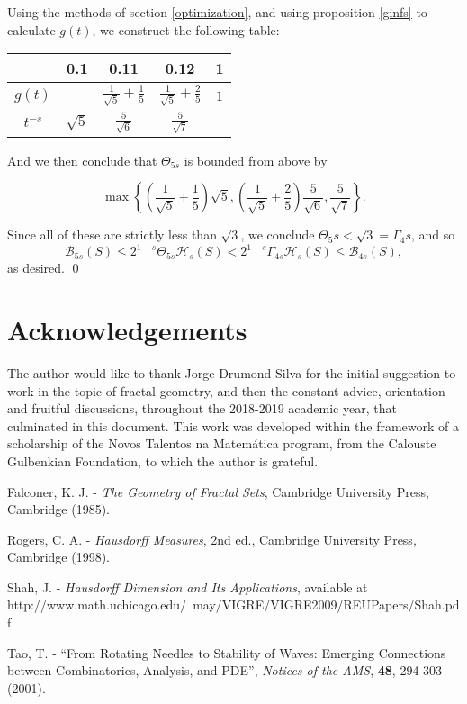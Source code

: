 \documentclass[11pt, reqno]{amsart}
\newcommand{\HH}{\mathcal{H}}
\newcommand{\BB}{\mathcal{B}}
\begin{document}
Using the methods of section \ref{optimization}, and using proposition \ref{ginfs} to calculate $g(t)$, we construct the following table:

\begin{center}
\tabulinesep=1.2mm
\begin{tabu}{| c | | c | @{\qquad\qquad} | c | @{\qquad\qquad} | c | @{\qquad\qquad} | c |}
\hline
& 0.1 & 0.11 & 0.12 & 1 \\
\hline
$g(t)$ & & $\frac 1 {\sqrt{5}} + \frac 1 5$ & $\frac 1 {\sqrt{5}} + \frac 2 5$ & $1$ \\
$t^{-s}$ & $\sqrt 5$ & $\frac 5 {\sqrt 6}$ & $\frac 5 {\sqrt 7}$ & \\
\hline
\end{tabu}
\end{center}

And we then conclude that $\Theta_{5s}$ is bounded from above by

\[ \max \left\{ \left(\frac 1 {\sqrt{5}} + \frac 1 5\right) \sqrt 5, \left(\frac 1 {\sqrt{5}} + \frac 2 5\right) \frac 5 {\sqrt 6}, \frac 5 {\sqrt 7} \right\}.\]

Since all of these are strictly less than $\sqrt 3$, we conclude $\Theta_5s < \sqrt3 = \Gamma_4s$, and so
\[\BB_{5s}(S) \leq 2^{1-s} \Theta_{5s} \HH_s(S) < 2^{1-s} \Gamma_{4s} \HH_s(S) \leq \BB_{4s}(S),\]
as desired. \qed

\section{Acknowledgements}

The author would like to thank Jorge Drumond Silva for the initial suggestion to work in the topic of fractal geometry, and then the constant advice, orientation and fruitful discussions, throughout the 2018-2019 academic year, that culminated in this document. This work was developed within the framework of a scholarship of the Novos Talentos na Matemática program, from the Calouste Gulbenkian Foundation, to which the author is grateful. 


\begin{thebibliography}{1}
Falconer, K. J. - \textit{The Geometry of Fractal Sets}, Cambridge University Press, Cambridge (1985).

Rogers, C. A. - \textit{Hausdorff Measures}, 2nd ed., Cambridge University Press, Cambridge (1998).

Shah, J. - \textit{Hausdorff Dimension and Its Applications}, available at http://www.math.uchicago.edu/~may/VIGRE/VIGRE2009/REUPapers/Shah.pdf

Tao, T. - ``From Rotating Needles to Stability of Waves: Emerging Connections between Combinatorics, Analysis, and PDE'', \textit{Notices of the AMS}, \textbf{48}, 294-303 (2001).

\end{thebibliography}
\end{document}
